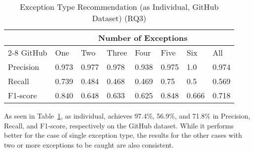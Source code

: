 \begin{table}[t]%
  \caption{Exception Type Recommendation (\xtype as Individual, GitHub Dataset) (RQ3)}
  \vspace{-12pt}
  \small
	\begin{center}
		\renewcommand{\arraystretch}{1}
		\begin{tabular}{| p{1.2cm}<{\centering} | p{0.6cm}<{\centering} | p{0.6cm}<{\centering}| p{0.6cm}<{\centering} | p{0.6cm}<{\centering} | p{0.6cm}<{\centering} | p{0.6cm}<{\centering} | p{0.6cm}<{\centering} |}
		  \hline
			\multirow{2}{*}{} & \multicolumn{7}{c|}{Number of Exceptions} \\
			\cline{2-8}
			GitHub & One & Two & Three & Four & Five & Six & All\\
			\hline
			Precision &  0.973 & 0.977 & 0.978 & 0.938 & 0.975 & 1.0 & 0.974\\
			\hline
			Recall &  0.739 & 0.484 & 0.468 & 0.469 & 0.75 & 0.5 & 0.569\\
			\hline
			F1-score &  0.840 & 0.648 & 0.633 & 0.625 & 0.848 & 0.666 & 0.718\\
			\hline
		\end{tabular}
		\label{tab:xtype-1}
	\end{center}
\end{table}

As seen in Table~\ref{tab:xtype-1}, as individual, {\xtype}
achieves 97.4\%, 56.9\%, and 71.8\% in Precision, Recall, and
F1-score, respectively on the GitHub dataset. While it performs better
for the case of single exception type, the results for the other cases
with two or more exceptions to be caught are also consistent.

